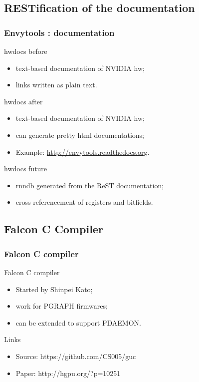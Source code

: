 \documentclass[11pt,english,compress]{beamer}
\begin{document}
\subsection{RESTification of the documentation}
\begin{frame}
	\frametitle{Envytools : documentation}

	\begin{block}{hwdocs before}
		\begin{itemize}
			\item text-based documentation of NVIDIA hw;
			\item links written as plain text.
		\end{itemize}
	\end{block}

	\begin{block}{hwdocs after}
		\begin{itemize}
			\item text-based documentation of NVIDIA hw;
			\item can generate pretty html documentations;
			\item Example: \url{http://envytools.readthedocs.org}.
		\end{itemize}
	\end{block}

	\begin{block}{hwdocs future}
		\begin{itemize}
			\item rnndb generated from the ReST documentation;
			\item cross referencement of registers and bitfields.
		\end{itemize}
	\end{block}
\end{frame}

\subsection{Falcon C Compiler}
\begin{frame}
	\frametitle{Falcon C compiler}

	\begin{block}{Falcon C compiler}
		\begin{itemize}
			\item Started by Shinpei Kato;
			\item work for PGRAPH firmwares;
			\item can be extended to support PDAEMON.
		\end{itemize}
	\end{block}

	\begin{block}{Links}
		\begin{itemize}
			\item Source: https://github.com/CS005/guc
			\item Paper: http://hgpu.org/?p=10251
		\end{itemize}
	\end{block}
\end{frame}
\end{document}

